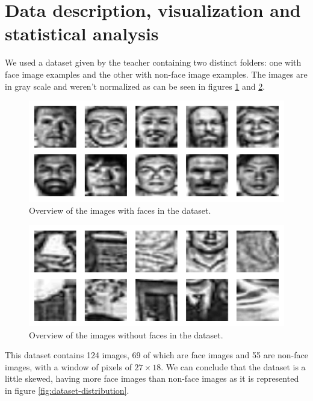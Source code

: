 \section{Data description, visualization and statistical analysis} \label{data-visualization}

We used a dataset given by the teacher containing two distinct folders: one with face image examples and the other with non-face image examples. The images are in gray scale and weren't normalized as can be seen in figures \ref{fig:faces-overview} and \ref{fig:non-faces-overview}.

\begin{figure}[htbp]
\centerline{\includegraphics[scale=0.35]{images/faces_overview.png}}
\caption{Overview of the images with faces in the dataset.}
\label{fig:faces-overview}
\end{figure}

\begin{figure}[htbp]
\centerline{\includegraphics[scale=0.35]{images/non_faces_overview.png}}
\caption{Overview of the images without faces in the dataset.}
\label{fig:non-faces-overview}
\end{figure}

This dataset contains 124 images, 69 of which are face images and 55 are non-face images, with a window of pixels of \(27 \times 18\). We can conclude that the dataset is a little skewed, having more face images than non-face images as it is represented in figure \ref{fig:dataset-distribution}.

